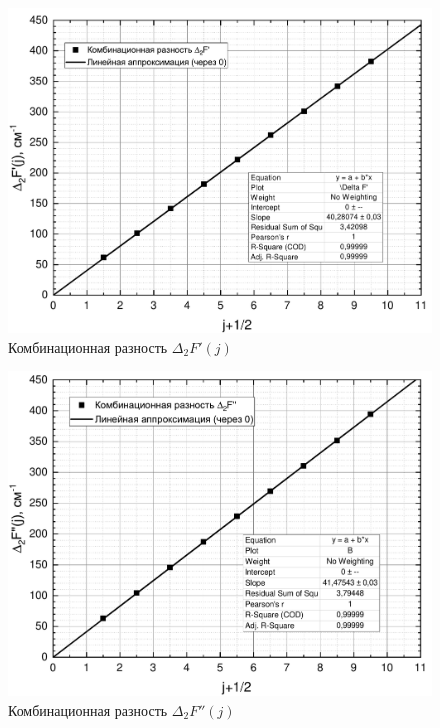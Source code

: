 \begin{figure}[H]
	\centering
	\includegraphics[height=0.45\textheight]{data/delta_F'}
	\caption{Комбинационная разность $\Delta_2F'(j)$}
	\label{deltaF'}
\end{figure}
\begin{figure}[H]
	\centering
	\includegraphics[height=0.45\textheight]{data/delta_F''}
	\caption{Комбинационная разность $\Delta_2F''(j)$}
	\label{deltaF''}
\end{figure}

